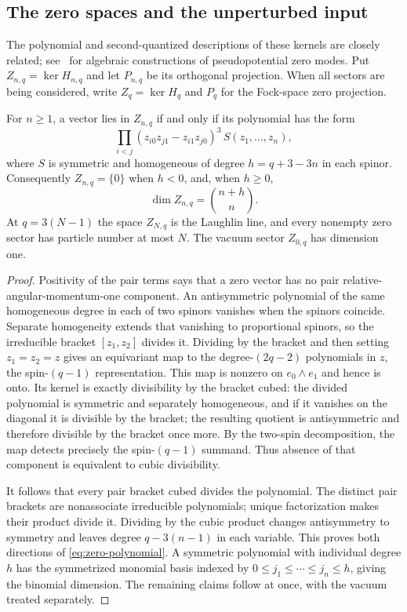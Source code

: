 \subsection{The zero spaces and the unperturbed input}

The polynomial and second-quantized descriptions of these kernels are
closely related; see~\cite{CS,MONS} for algebraic constructions of
pseudopotential zero modes. Put $Z_{n,q}=\ker H_{n,q}$ and let $P_{n,q}$ be its orthogonal
projection. When all sectors are being considered, write
$Z_q=\ker H_q$ and $P_q$ for the Fock-space zero projection.

\begin{lemma}\label{lem:zero-modes}
For $n\ge1$, a vector lies in $Z_{n,q}$ if and only if its polynomial
has the form
\begin{equation}\label{eq:zero-polynomial}
 \prod_{i<j}(z_{i0}z_{j1}-z_{i1}z_{j0})^3\,S(z_1,\ldots,z_n),
\end{equation}
where $S$ is symmetric and homogeneous of degree
$h=q+3-3n$ in each spinor. Consequently $Z_{n,q}=\{0\}$ when
$h<0$, and, when $h\ge0$,
\[
 \dim Z_{n,q}=\binom{n+h}{n}.
\]
At $q=3(N-1)$ the space $Z_{N,q}$ is the Laughlin line, and every
nonempty zero sector has particle number at most $N$.
The vacuum sector $Z_{0,q}$ has dimension one.
\end{lemma}
\begin{proof}
Positivity of the pair terms says that a zero vector has no pair
relative-angular-momentum-one component. An antisymmetric polynomial
of the same homogeneous degree in each of two spinors vanishes when
the spinors coincide. Separate homogeneity extends that vanishing to
proportional spinors, so the irreducible bracket $[z_1,z_2]$ divides it.
Dividing by
the bracket and then setting $z_1=z_2=z$ gives an equivariant map to
the degree-$(2q-2)$ polynomials in $z$, the spin-$(q-1)$ representation.
This map is nonzero on $e_0\wedge e_1$ and hence is onto. Its kernel
is exactly divisibility by the bracket cubed: the divided polynomial
is symmetric and separately homogeneous, and if it vanishes on the
diagonal it is divisible by
the bracket; the resulting quotient is antisymmetric and therefore
divisible by the bracket once more. By the two-spin decomposition,
the map detects precisely the spin-$(q-1)$ summand. Thus absence of
that component is equivalent to cubic divisibility.

It follows that every pair bracket cubed divides the polynomial.
The distinct pair brackets are nonassociate irreducible polynomials;
unique factorization makes their product divide it. Dividing by the
cubic product changes antisymmetry to symmetry and leaves degree
$q-3(n-1)$ in each variable. This proves both directions of
\eqref{eq:zero-polynomial}. A symmetric polynomial with individual
degree $h$ has the symmetrized monomial basis indexed by
$0\le j_1\le\cdots\le j_n\le h$, giving the binomial dimension.
The remaining claims follow at once, with the vacuum treated separately.
\end{proof}

